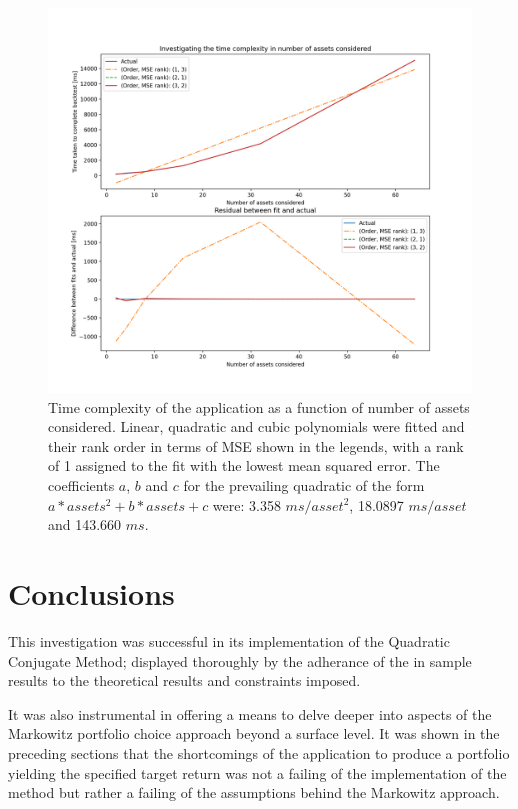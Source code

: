\documentclass{article}
\begin{document}
\begin{figure}[H]
	\centerline{\includegraphics[width=\textwidth]{figures/time_complexity_in_assets.png}}
	\caption{Time complexity of the application as a function of number of assets considered. Linear, quadratic and cubic polynomials were fitted and their rank order in terms of MSE shown in the legends, with a rank of 1 assigned to the fit with the lowest mean squared error. The coefficients $a$, $b$ and $c$ for the prevailing quadratic of the form $a* assets^2 + b * assets + c$ were: 3.358 $ms/asset^{2}$, 18.0897 $ms/asset$ and 143.660 $ms$.}
	\label{fig:time_complexity_in_assets}
\end{figure}



\section{Conclusions}
\label{sec:concs}


This investigation was successful in its implementation of the Quadratic Conjugate Method; displayed thoroughly by the adherance of the in sample results to the theoretical results and constraints imposed.

It was also instrumental in offering a means to delve deeper into aspects of the Markowitz portfolio choice approach beyond a surface level. It was shown in the preceding sections that the shortcomings of the application to produce a portfolio yielding the specified target return was not a failing of the implementation of the method but rather a failing of the assumptions behind the Markowitz approach.
\end{document}
